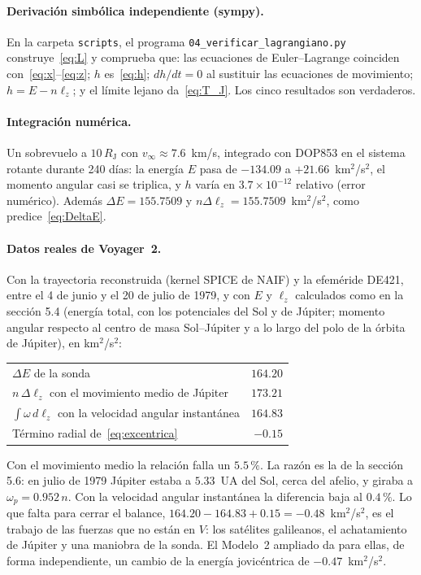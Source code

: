 \documentclass[12pt,letterpaper]{article}
\begin{document}
\paragraph{Derivación simbólica independiente (sympy).}
En la carpeta \texttt{scripts}, el programa \texttt{04\_verificar\_lagrangiano.py} construye~\eqref{eq:L} y comprueba
que: las ecuaciones de Euler--Lagrange coinciden con~\eqref{eq:x}--\eqref{eq:z}; $h$
es~\eqref{eq:h}; $dh/dt = 0$ al sustituir las ecuaciones de movimiento; $h = E - n\ell_z$; y el
límite lejano da~\eqref{eq:T_J}. Los cinco resultados son verdaderos.

\paragraph{Integración numérica.} Un sobrevuelo a $10\,R_{\mathrm J}$ con
$v_\infty \approx 7.6$~km/s, integrado con DOP853 en el sistema rotante durante 240 días: la energía
$E$ pasa de $-134.09$ a $+21.66$~km$^2$/s$^2$, el momento angular casi se triplica,
y $h$ varía en $3.7\times10^{-12}$ relativo (error numérico). Además $\Delta E = 155.7509$ y
$n\Delta\ell_z = 155.7509$~km$^2$/s$^2$, como predice~\eqref{eq:DeltaE}.

\paragraph{Datos reales de Voyager~2.} Con la trayectoria reconstruida (kernel SPICE de NAIF)
y la efeméride DE421, entre el 4 de junio y el 20 de julio de 1979, y con $E$ y $\ell_z$
calculados como en la sección 5.4 (energía total, con los potenciales del Sol y de Júpiter;
momento angular respecto al centro de masa Sol--Júpiter y a lo largo del polo de la órbita de
Júpiter), en km$^2$/s$^2$:
\begin{center}
\begin{tabular}{lr}
\toprule
$\Delta E$ de la sonda & $164.20$ \\
$n\,\Delta\ell_z$ con el movimiento medio de Júpiter & $173.21$ \\
$\int\omega\,d\ell_z$ con la velocidad angular instantánea & $164.83$ \\
Término radial de~\eqref{eq:excentrica} & $-0.15$ \\
\bottomrule
\end{tabular}
\end{center}
Con el movimiento medio la relación falla un $5.5\,\%$. La razón es la de la sección 5.6: en
julio de 1979 Júpiter estaba a $5.33$~UA del Sol, cerca del afelio, y giraba a
$\omega_p = 0.952\,n$. Con la velocidad angular instantánea la diferencia baja al $0.4\,\%$. Lo
que falta para cerrar el balance, $164.20 - 164.83 + 0.15 = -0.48$~km$^2$/s$^2$, es el trabajo
de las fuerzas que no están en $V$: los satélites galileanos, el achatamiento de Júpiter y una
maniobra de la sonda. El Modelo~2 ampliado da para ellas, de forma independiente, un cambio de
la energía jovicéntrica de $-0.47$~km$^2$/s$^2$.
\end{document}
